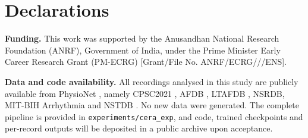 \documentclass[preprint,12pt]{elsarticle}
\newcommand{\1}{\mathbf{1}}
\begin{document}
\section*{Declarations}
\noindent\textbf{Funding.} This work was supported by the Anusandhan National Research Foundation (ANRF), Government of India, under the Prime Minister Early Career Research Grant (PM-ECRG) [Grant/File No. ANRF/\allowbreak ECRG///\allowbreak ENS].

\noindent\textbf{Data and code availability.} All recordings analysed in this study are publicly available from PhysioNet \cite{goldberger2000physionet}, namely CPSC2021 \cite{cpsc2021}, AFDB \cite{moody1983afdb}, LTAFDB \cite{petrutiu2007ltafdb}, NSRDB, MIT-BIH Arrhythmia \cite{moody2001mitbih} and NSTDB \cite{moody1984nstdb}. No new data were generated. The complete pipeline is provided in \texttt{experiments/cera\_exp}, and code, trained checkpoints and per-record outputs will be deposited in a public archive upon acceptance.



\end{document}
